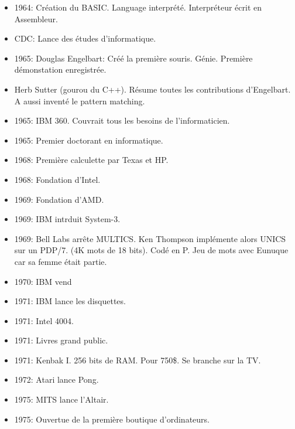 \documentclass[a4paper,11pt]{article}
\begin{document}
\begin{itemize}
\item 1964: Création du BASIC. Language interprété. Interpréteur écrit en
  Assembleur.

\item CDC: Lance des études d'informatique.

\item 1965: Douglas Engelbart: Créé la première souris. Génie. Première
  démonstation enregistrée.

\item Herb Sutter (gourou du C++). Résume toutes les contributions d'Engelbart.
  A aussi inventé le pattern matching.

\item 1965: IBM 360. Couvrait tous les besoins de l'informaticien.

\item 1965: Premier doctorant en informatique.

\item 1968: Première calculette par Texas et HP.

\item 1968: Fondation d'Intel.

\item 1969: Fondation d'AMD.

\item 1969: IBM intrduit System-3.

\item 1969: Bell Labs arrête MULTICS. Ken Thompson implémente alors UNICS sur un
  PDP/7. (4K mots de 18 bits). Codé en P. Jeu de mots avec Eunuque car sa femme
  était partie.

\item 1970: IBM vend

\item 1971: IBM lance les disquettes.

\item 1971: Intel 4004.

\item 1971: Livres grand public.

\item 1971: Kenbak I. 256 bits de RAM. Pour 750\$. Se branche sur la TV.

\item 1972: Atari lance Pong.

\item 1975: MITS lance l'Altair.

\item 1975: Ouvertue de la première boutique d'ordinateurs.


\end{itemize}
\end{document}
